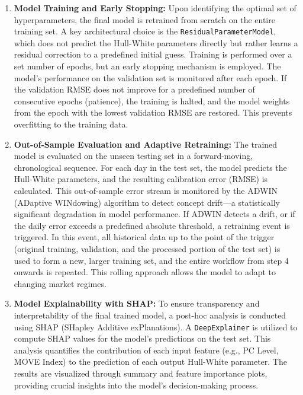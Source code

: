 {\begin{enumerate}
	\item \textbf{Model Training and Early Stopping:}
	      Upon identifying the optimal set of hyperparameters, the final model is retrained from scratch on the entire training set. A key architectural choice is the \texttt{ResidualParameterModel}, which does not predict the Hull-White parameters directly but rather learns a residual correction to a predefined initial guess. Training is performed over a set number of epochs, but an early stopping mechanism is employed. The model's performance on the validation set is monitored after each epoch. If the validation RMSE does not improve for a predefined number of consecutive epochs (patience), the training is halted, and the model weights from the epoch with the lowest validation RMSE are restored. This prevents overfitting to the training data.

	\item \textbf{Out-of-Sample Evaluation and Adaptive Retraining:}
	      The trained model is evaluated on the unseen testing set in a forward-moving, chronological sequence. For each day in the test set, the model predicts the Hull-White parameters, and the resulting calibration error (RMSE) is calculated. This out-of-sample error stream is monitored by the ADWIN (ADaptive WINdowing) algorithm to detect concept drift—a statistically significant degradation in model performance. If ADWIN detects a drift, or if the daily error exceeds a predefined absolute threshold, a retraining event is triggered. In this event, all historical data up to the point of the trigger (original training, validation, and the processed portion of the test set) is used to form a new, larger training set, and the entire workflow from step 4 onwards is repeated. This rolling approach allows the model to adapt to changing market regimes.

	\item \textbf{Model Explainability with SHAP:}
	      To ensure transparency and interpretability of the final trained model, a post-hoc analysis is conducted using SHAP (SHapley Additive exPlanations). A \texttt{DeepExplainer} is utilized to compute SHAP values for the model's predictions on the test set. This analysis quantifies the contribution of each input feature (e.g., PC Level, MOVE Index) to the prediction of each output Hull-White parameter. The results are visualized through summary and feature importance plots, providing crucial insights into the model's decision-making process.
\end{enumerate}

}
